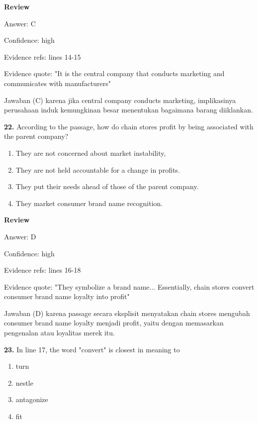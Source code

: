 \documentclass[12pt]{article}
\begin{document}
\par
\begingroup
\setlength{\parskip}{0pt}
\setlength{\parindent}{0pt}
\textbf{Review}\par
Answer: C\par
Confidence: high\par
Evidence refs: lines 14-15\par
Evidence quote: "It is the central company that conducts marketing and communicates with manufacturers"\par
Jawaban (C) karena jika central company conducts marketing, implikasinya perusahaan induk kemungkinan besar menentukan bagaimana barang diiklankan.\par
\endgroup
\par
\vspace{0.25\baselineskip}
\noindent\textbf{22.} According to the passage, how do chain stores profit by being associated with the parent company?
\begin{enumerate}[label=(\Alph*),leftmargin=*,itemsep=0.2em]
\item They are not concerned about market instability,
\item They are not held accountable for a change in profits.
\item They put their needs ahead of those of the parent company.
\item They market consumer brand name recognition.
\end{enumerate}
\par
\begingroup
\setlength{\parskip}{0pt}
\setlength{\parindent}{0pt}
\textbf{Review}\par
Answer: D\par
Confidence: high\par
Evidence refs: lines 16-18\par
Evidence quote: "They symbolize a brand name... Essentially, chain stores convert consumer brand name loyalty into profit"\par
Jawaban (D) karena passage secara eksplisit menyatakan chain stores mengubah consumer brand name loyalty menjadi profit, yaitu dengan memasarkan pengenalan atau loyalitas merek itu.\par
\endgroup
\par
\vspace{0.25\baselineskip}
\noindent\textbf{23.} In line 17, the word "convert" is closest in meaning to
\begin{enumerate}[label=(\Alph*),leftmargin=*,itemsep=0.2em]
\item turn
\item nestle
\item antagonize
\item fit
\end{enumerate}
\end{document}
